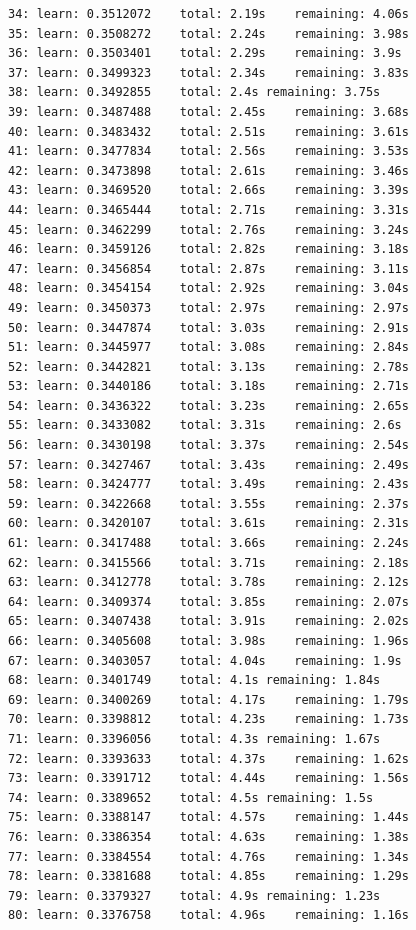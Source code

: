 \documentclass[
  letterpaper,
  DIV=11,
  numbers=noendperiod]{scrartcl}
\begin{document}
\begin{verbatim}
34: learn: 0.3512072    total: 2.19s    remaining: 4.06s
35: learn: 0.3508272    total: 2.24s    remaining: 3.98s
36: learn: 0.3503401    total: 2.29s    remaining: 3.9s
37: learn: 0.3499323    total: 2.34s    remaining: 3.83s
38: learn: 0.3492855    total: 2.4s remaining: 3.75s
39: learn: 0.3487488    total: 2.45s    remaining: 3.68s
40: learn: 0.3483432    total: 2.51s    remaining: 3.61s
41: learn: 0.3477834    total: 2.56s    remaining: 3.53s
42: learn: 0.3473898    total: 2.61s    remaining: 3.46s
43: learn: 0.3469520    total: 2.66s    remaining: 3.39s
44: learn: 0.3465444    total: 2.71s    remaining: 3.31s
45: learn: 0.3462299    total: 2.76s    remaining: 3.24s
46: learn: 0.3459126    total: 2.82s    remaining: 3.18s
47: learn: 0.3456854    total: 2.87s    remaining: 3.11s
48: learn: 0.3454154    total: 2.92s    remaining: 3.04s
49: learn: 0.3450373    total: 2.97s    remaining: 2.97s
50: learn: 0.3447874    total: 3.03s    remaining: 2.91s
51: learn: 0.3445977    total: 3.08s    remaining: 2.84s
52: learn: 0.3442821    total: 3.13s    remaining: 2.78s
53: learn: 0.3440186    total: 3.18s    remaining: 2.71s
54: learn: 0.3436322    total: 3.23s    remaining: 2.65s
55: learn: 0.3433082    total: 3.31s    remaining: 2.6s
56: learn: 0.3430198    total: 3.37s    remaining: 2.54s
57: learn: 0.3427467    total: 3.43s    remaining: 2.49s
58: learn: 0.3424777    total: 3.49s    remaining: 2.43s
59: learn: 0.3422668    total: 3.55s    remaining: 2.37s
60: learn: 0.3420107    total: 3.61s    remaining: 2.31s
61: learn: 0.3417488    total: 3.66s    remaining: 2.24s
62: learn: 0.3415566    total: 3.71s    remaining: 2.18s
63: learn: 0.3412778    total: 3.78s    remaining: 2.12s
64: learn: 0.3409374    total: 3.85s    remaining: 2.07s
65: learn: 0.3407438    total: 3.91s    remaining: 2.02s
66: learn: 0.3405608    total: 3.98s    remaining: 1.96s
67: learn: 0.3403057    total: 4.04s    remaining: 1.9s
68: learn: 0.3401749    total: 4.1s remaining: 1.84s
69: learn: 0.3400269    total: 4.17s    remaining: 1.79s
70: learn: 0.3398812    total: 4.23s    remaining: 1.73s
71: learn: 0.3396056    total: 4.3s remaining: 1.67s
72: learn: 0.3393633    total: 4.37s    remaining: 1.62s
73: learn: 0.3391712    total: 4.44s    remaining: 1.56s
74: learn: 0.3389652    total: 4.5s remaining: 1.5s
75: learn: 0.3388147    total: 4.57s    remaining: 1.44s
76: learn: 0.3386354    total: 4.63s    remaining: 1.38s
77: learn: 0.3384554    total: 4.76s    remaining: 1.34s
78: learn: 0.3381688    total: 4.85s    remaining: 1.29s
79: learn: 0.3379327    total: 4.9s remaining: 1.23s
80: learn: 0.3376758    total: 4.96s    remaining: 1.16s

\end{verbatim}
\end{document}
